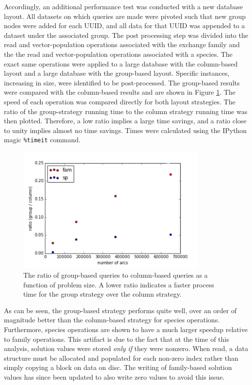 Accordingly, an additional performance test was conducted with a new database
layout. All datasets on which queries are made were pivoted such that new group
nodes were added for each UUID, and all data for that UUID was appended to a
dataset under the associated group. The post processing step was divided into
the read and vector-population operations associated with the exchange family
and the the read and vector-population operations associated with a species. The
exact same operations were applied to a large database with the column-based
layout and a large database with the group-based layout. Specific instances,
increasing in size, were identified to be post-processed. The group-based results
were compared with the column-based results and are shown in Figure
\ref{fig:col_grp}. The speed of each operation was compared directly for both
layout strategies. The ratio of the group-strategy running time to the column
strategy running time was then plotted. Therefore, a low ratio implies a large
time savings, and a ratio close to unity implies almost no time savings. Times
were calculated using the IPython magic \texttt{\%timeit} command.

\begin{figure}
  \begin{center}
    \includegraphics[width=0.85\textwidth]{./backmatter/figs/grp_v_col_ratio.pdf}
    \caption{
      \label{fig:col_grp}
      The ratio of group-based queries to column-based queries as a function of
      problem size. A lower ratio indicates a faster process time for the group
      strategy over the column strategy.}
  \end{center}
\end{figure}

As can be seen, the group-based strategy performs quite well, over an order of
magnitude better than the column-based strategy for species
operations. Furthermore, species operations are shown to have a much larger
speedup relative to family operations. This artifact is due to the fact that at
the time of this analysis, solution values were stored \textit{only if} they
were nonzero. When read, a data structure must be allocated and populated for
each non-zero index rather than simply copying a block on data on disc. The
writing of family-based solution values has since been updated to also write
zero values to avoid this issue.

